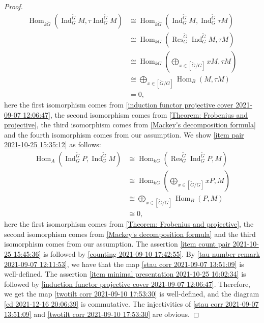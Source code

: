 \documentclass[pdftex,a4paper]{article}
\numberwithin{equation}{subsection}
\theoremstyle{definition}
\newcommand{\Hom}{\operatorname{Hom}\nolimits}
\newcommand{\induc}{{\operatorname{Ind}\nolimits}}
\newcommand{\restr}{{\operatorname{Res}\nolimits}}
\begin{document}
\begin{proof}
	\begin{align}
		\Hom_{k\tilde{G}}(\induc_G^{\tilde{G}}M,\tau\induc_G^{\tilde{G}}M)
		 & \cong \Hom_{k\tilde{G}}(\induc_G^{\tilde{G}}M,\induc_G^{\tilde{G}}\tau M) \\
		 & \cong \Hom_{kG}(\restr_G^{\tilde{G}}\induc_G^{\tilde{G}}M,\tau M)         \\
		 & \cong \Hom_{kG}(\bigoplus_{x\in[\tilde{G}/G]}xM,\tau M)                   \\
		 & \cong \bigoplus_{x\in[\tilde{G}/G]}\Hom_{B}(M,\tau M)                     \\
		 & = 0,
	\end{align}
	here the first isomorphism comes from \cref{induction functor projective cover 2021-09-07 12:06:47}, the second isomorphism comes from \cref{Theorem: Frobenius and projective}, the third isomorphism comes from \cref{Mackey's decomposition formula} and the fourth isomorphism comes from our assumption. We show \ref{item pair 2021-10-25 15:35:12} as follows:
	\begin{align}
		\Hom_{A}(\induc_G^{\tilde{G}} P,\induc_G^{\tilde{G}} M)
		 & \cong \Hom_{kG}(\restr_G^{\tilde{G}} \induc_G^{\tilde{G}} P,M) \\
		 & \cong \Hom_{kG}(\bigoplus_{x\in[\tilde{G}/G]}x P,M)            \\
		 & \cong \bigoplus_{x\in[\tilde{G}/G]}\Hom_{B}( P,M)              \\
		 & \cong 0,
	\end{align}
	here the first isomorphism comes from \cref{Theorem: Frobenius and projective}, the second isomorphism comes from \cref{Mackey's decomposition formula} and the third isomorphism comes from our assumption.
	The assertion \ref{item count pair 2021-10-25 15:45:36} is followed by \cref{counting 2021-09-10 17:42:55}.
	By \cref{tau number remark 2021-09-07 12:11:53}, we have that the map \eqref{stau corr 2021-09-07 13:51:09} is well-defined.
	The assertion \ref{item minimal presentation 2021-10-25 16:02:34} is followed by \cref{induction functor projective cover 2021-09-07 12:06:47}.
	Therefore, we get the map \eqref{twotilt corr 2021-09-10 17:53:30} is well-defined, and the diagram \eqref{cd 2021-12-16 20:06:39} is commutative.
	The injectivities of \eqref{stau corr 2021-09-07 13:51:09} and \eqref{twotilt corr 2021-09-10 17:53:30} are obvious.
\end{proof}
\end{document}
